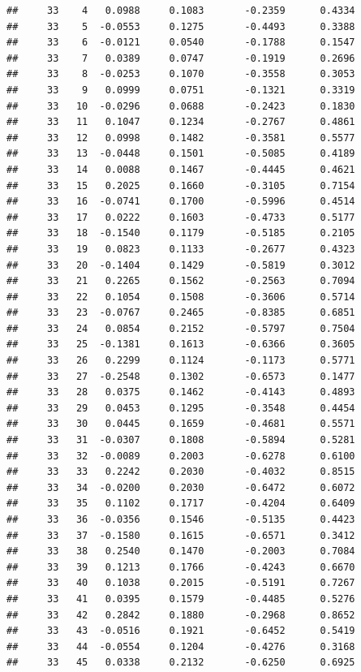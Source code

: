 \documentclass[
]{article}
\begin{document}
\begin{verbatim}
##     33    4   0.0988     0.1083       -0.2359      0.4334  
##     33    5  -0.0553     0.1275       -0.4493      0.3388  
##     33    6  -0.0121     0.0540       -0.1788      0.1547  
##     33    7   0.0389     0.0747       -0.1919      0.2696  
##     33    8  -0.0253     0.1070       -0.3558      0.3053  
##     33    9   0.0999     0.0751       -0.1321      0.3319  
##     33   10  -0.0296     0.0688       -0.2423      0.1830  
##     33   11   0.1047     0.1234       -0.2767      0.4861  
##     33   12   0.0998     0.1482       -0.3581      0.5577  
##     33   13  -0.0448     0.1501       -0.5085      0.4189  
##     33   14   0.0088     0.1467       -0.4445      0.4621  
##     33   15   0.2025     0.1660       -0.3105      0.7154  
##     33   16  -0.0741     0.1700       -0.5996      0.4514  
##     33   17   0.0222     0.1603       -0.4733      0.5177  
##     33   18  -0.1540     0.1179       -0.5185      0.2105  
##     33   19   0.0823     0.1133       -0.2677      0.4323  
##     33   20  -0.1404     0.1429       -0.5819      0.3012  
##     33   21   0.2265     0.1562       -0.2563      0.7094  
##     33   22   0.1054     0.1508       -0.3606      0.5714  
##     33   23  -0.0767     0.2465       -0.8385      0.6851  
##     33   24   0.0854     0.2152       -0.5797      0.7504  
##     33   25  -0.1381     0.1613       -0.6366      0.3605  
##     33   26   0.2299     0.1124       -0.1173      0.5771  
##     33   27  -0.2548     0.1302       -0.6573      0.1477  
##     33   28   0.0375     0.1462       -0.4143      0.4893  
##     33   29   0.0453     0.1295       -0.3548      0.4454  
##     33   30   0.0445     0.1659       -0.4681      0.5571  
##     33   31  -0.0307     0.1808       -0.5894      0.5281  
##     33   32  -0.0089     0.2003       -0.6278      0.6100  
##     33   33   0.2242     0.2030       -0.4032      0.8515  
##     33   34  -0.0200     0.2030       -0.6472      0.6072  
##     33   35   0.1102     0.1717       -0.4204      0.6409  
##     33   36  -0.0356     0.1546       -0.5135      0.4423  
##     33   37  -0.1580     0.1615       -0.6571      0.3412  
##     33   38   0.2540     0.1470       -0.2003      0.7084  
##     33   39   0.1213     0.1766       -0.4243      0.6670  
##     33   40   0.1038     0.2015       -0.5191      0.7267  
##     33   41   0.0395     0.1579       -0.4485      0.5276  
##     33   42   0.2842     0.1880       -0.2968      0.8652  
##     33   43  -0.0516     0.1921       -0.6452      0.5419  
##     33   44  -0.0554     0.1204       -0.4276      0.3168  
##     33   45   0.0338     0.2132       -0.6250      0.6925  

\end{verbatim}
\end{document}
